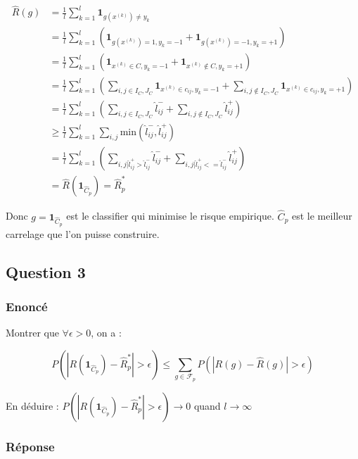 \documentclass[french]{article}
\begin{document}
\begin{align}
\hat{R}(g) &= \frac{1}{l}\sum_{k=1}^{l}\mathbf{1}_{g(x^{(k)}) \neq y_{k}} \\
&= \frac{1}{l}\sum_{k=1}^{l} \left( \mathbf{1}_{g(x^{(k)})=1,y_{k}=-1} + \mathbf{1}_{g(x^{(k)})=-1,y_{k}=+1}
\right) \\
&= \frac{1}{l}\sum_{k=1}^{l} \left( \mathbf{1}_{x^{(k)}\in C,y_{k}=-1} + \mathbf{1}_{x^{(k)} \notin C,y_{k}=+1}
\right) \\
&= \frac{1}{l}\sum_{k=1}^{l} \left( \sum_{i,j \in I_{C},J_{C}}\mathbf{1}_{x^{(k)}\in c_{ij},y_{k}=-1} + \sum_{i,j \notin I_{C},J_{C}} \mathbf{1}_{x^{(k)} \in c_{ij},y_{k}=+1}
\right) \\
&= \frac{1}{l}\sum_{k=1}^{l} \left( \sum_{i,j \in I_{C},J_{C}} \hat{l}_{ij}^{-} + \sum_{i,j \notin I_{C},J_{C}} \hat{l}_{ij}^{+}
\right) \\
&\geq \frac{1}{l}\sum_{k=1}^{l} \sum_{i,j} \mathrm{min}\left( \hat{l}_{ij}^{-}, \hat{l}_{ij}^{+} \right) \\
&= \frac{1}{l}\sum_{k=1}^{l} \left( \sum_{i,j | \hat{l}_{ij}^{+} > \hat{l}_{ij}^{-}} \hat{l}_{ij}^{-} + \sum_{i,j | \hat{l}_{ij}^{+} <= \hat{l}_{ij}^{-}} \hat{l}_{ij}^{+}
\right) \\
&= \hat{R}(\mathbf{1}_{\hat{C}_{p}}) = \hat{R}^{*}_{p}
\end{align}

Donc $ g = \mathbf{1}_{\hat{C}_{p}} $ est le classifier qui minimise le risque empirique. $\hat{C}_{p}$ est le meilleur carrelage que l'on puisse construire.


\subsection{Question 3}

\subsubsection{Enoncé}

Montrer que $\forall \epsilon > 0$, on a :

\[
P(|R(\mathbf{1}_{\hat{C}_{p}}) - \hat{R}^{*}_{p}| > \epsilon) \leq
\sum_{g \in \mathcal{F}_{p}} 
P(|R(g) - \hat{R}(g)| > \epsilon)
\]

En déduire : $ P(|R(\mathbf{1}_{\hat{C}_{p}}) - \hat{R}^{*}_{p}| > \epsilon) \rightarrow 0 $ quand $l \rightarrow \infty$

\subsubsection{Réponse}
\end{document}

